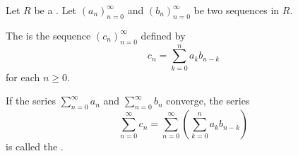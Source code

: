 \begin{definition} \label{definition:cauchy_product_of_two_sequences_in_a_commutative_ring}
    Let $R$ be a . Let $(a_n)_{n=0}^\infty$ and $(b_n)_{n=0}^\infty$ be two sequences in $R$.

    The  is the sequence $(c_n)_{n=0}^\infty$ defined by
    $$c_n = \sum_{k=0}^n a_k b_{n-k}$$
    for each $n \geq 0$.

    If the series $\sum_{n=0}^\infty a_n$ and $\sum_{n=0}^\infty b_n$ converge, the series
    $$\sum_{n=0}^\infty c_n = \sum_{n=0}^\infty \left( \sum_{k=0}^n a_k b_{n-k} \right)$$
    is called the .
\end{definition}
